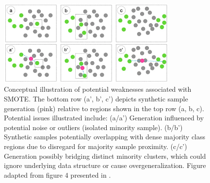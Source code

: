\documentclass[12pt,a4paper]{report}
\begin{document}
\begin{figure}[htbp]
    \centering
    \includegraphics[width=0.8\textwidth]{images/SMOTE-weaknesses.png}
    \caption[Illustration of SMOTE weaknesses]{Conceptual illustration of potential weaknesses associated with SMOTE. The bottom row (a', b', c') depicts synthetic sample generation (pink) relative to regions shown in the top row (a, b, c). Potential issues illustrated include: (a/a') Generation influenced by potential noise or outliers (isolated minority sample). (b/b') Synthetic samples potentially overlapping with dense majority class regions due to disregard for majority sample proximity. (c/c') Generation possibly bridging distinct minority clusters, which could ignore underlying data structure or cause overgeneralization. Figure adapted from figure 4 presented in \cite{Truong2022SMOTEVariants}.}
    \label{fig:SMOTE_weaknesses} %
\end{figure}
\end{document}
